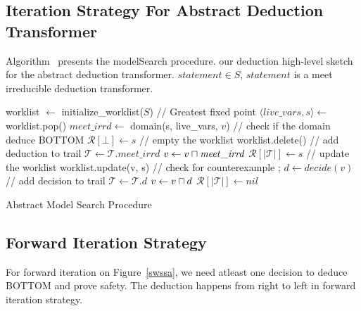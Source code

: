 \subsection{Iteration Strategy For Abstract Deduction Transformer}
Algorithm~\label{Alg:iteration} presents the modelSearch procedure. 
our deduction high-level sketch for the abstract deduction transformer.
$statement \in S$, $statement$ is a meet irreducible deduction transformer.
\begin{algorithm2e}[t]
\DontPrintSemicolon
{}
\begin{small}
worklist $\leftarrow$ initialize\_worklist($S$) \;
\Loop{}
{
// Greatest fixed point \;
{
  $\langle live\_vars, s \rangle \leftarrow$ worklist.pop() \;
  $\mathit{meet\_irrd} \leftarrow$ domain(s, live\_vars, $v$)\;
  // check if the domain deduce BOTTOM \;
   {
    $\mathcal{R}[\bot] \leftarrow s$ \;
    // empty the worklist \;
    worklist.delete() \;
    \return \safe \;
  }
  \uElse
  {
    // add deduction to trail \;
    $\mathcal{T} \leftarrow \mathcal{T} . \mathit{meet\_irrd}$ \; 
    $v \leftarrow v \sqcap \mathit{meet\_irrd}$ \; 
    $\mathcal{R}[|\mathcal{T}|] \leftarrow s$ \;
    // update the worklist \;
    worklist.update(v, s) \; 
  }
}
// check for counterexample\;
 {
  \return \unsafe;
}
$d \leftarrow decide(v)$ \;
 {
\return \unknown \;
}
// add decision to trail\;
$\mathcal{T} \leftarrow \mathcal{T} . d$ \; 
$v \leftarrow v \sqcap d$ \; 
$\mathcal{R}[|\mathcal{T}|] \leftarrow nil$ \;
}
\end{small}
\caption{Abstract Model Search Procedure\label{Alg:model_search}}
\end{algorithm2e}


\subsection{Forward Iteration Strategy}
For forward iteration on Figure~\ref{swssa}, we need atleast 
one decision to deduce BOTTOM and prove safety. The deduction 
happens from right to left in forward iteration strategy.

